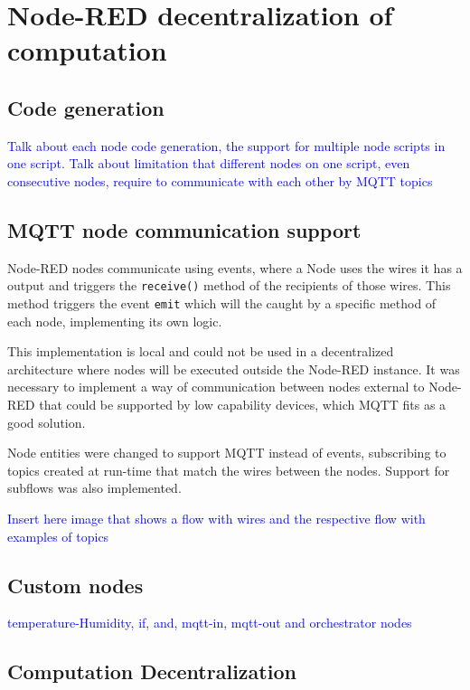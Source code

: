 \section{Node-RED decentralization of computation}\label{sec:node_red_decentralization}

\subsection{Code generation}\label{sec:code_generation}

\textcolor{blue}{Talk about each node code generation, the support for multiple node scripts in one script. Talk about limitation that different nodes on one script, even consecutive nodes, require to communicate with each other by MQTT topics}

\subsection{MQTT node communication support}\label{sec:mqtt_support}

 Node-RED nodes communicate using events, where a Node uses the wires it has a output and triggers the \texttt{receive()} method of the recipients of those wires. This method triggers the event \texttt{emit} which will the caught by a specific method of each node, implementing its own logic.

This implementation is local and could not be used in a decentralized architecture where nodes will be executed outside the Node-RED instance. It was necessary to implement a way of communication between nodes external to Node-RED that could be supported by low capability devices, which MQTT fits as a good solution.

Node entities were changed to support MQTT instead of events, subscribing to topics created at run-time that match the wires between the nodes. Support for subflows was also implemented.

\textcolor{blue}{Insert here image that shows a flow with wires and the respective flow with examples of topics}

\subsection{Custom nodes}\label{sec:custom_nodes}

\textcolor{blue}{temperature-Humidity, if, and, mqtt-in, mqtt-out and orchestrator nodes}

\subsection{Computation Decentralization}\label{sec:node_red_computation_decentralization}

